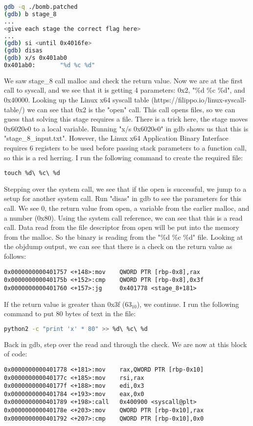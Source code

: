\documentclass{article}
\begin{document}
\begin{lstlisting}[language=Bash]
gdb -q ./bomb.patched
(gdb) b stage_8
...
<give each stage the correct flag here>
...
(gdb) si <until 0x4016fe>
(gdb) disas
(gdb) x/s 0x401ab0
0x401ab0:       "%d %c %d"
\end{lstlisting}
We saw stage\_8 call malloc and check the return value.  Now we are at the 
first call to syscall, and we see that it is getting 4 parameters: 0x2, "\%d
\%c \%d", and 0x40000.  Looking up the Linux x64 syscall table 
(https://filippo.io/linux-syscall-table/) we can see that 0x2 is the "open" 
call.  This call opens files, so we can guess that solving this stage requires
a file.  There is a trick here, the stage moves 0x6020e0 to a local variable.
Running "x/s 0x6020e0" in gdb shows us that this is "stage\_8\_input.txt".  
However, the Linux x64 Application Binary Interface requires 6 registers to be
used before passing stack parameters to a function call, so this is a red 
herring.  I run the following command to create the required file:
\begin{lstlisting}
touch %d\ %c\ %d
\end{lstlisting}
\par
Stepping over the system call, we see that if the open is successful, we jump
to a setup for another system call.  Run "disas" in gdb to see the parameters
for this call.  We see 0, the return value from open, a variable from the 
earlier malloc, and a number (0x80).  Using the system call reference, we can
see that this is a read call.  Data read from the file descriptor from open 
will be put into the memory from the malloc.  So the binary is reading from 
the "\%d \%c \%d" file.  Looking at the objdump output, we can see that there 
is a check on the return value as follows:
\begin{lstlisting}
0x0000000000401757 <+148>:mov    QWORD PTR [rbp-0x8],rax
0x000000000040175b <+152>:cmp    QWORD PTR [rbp-0x8],0x3f
0x0000000000401760 <+157>:jg     0x401778 <stage_8+181>
\end{lstlisting}
\par
If the return value is greater than 0x3f ($63_{10}$), we continue.  I run the
following command to put 80 bytes of text in the file: 
\begin{lstlisting}[language=Bash]
python2 -c "print 'x' * 80" >> %d\ %c\ %d
\end{lstlisting}
Back in gdb, step over the read and through the check.  We are now at this block of code:
\begin{lstlisting}
0x0000000000401778 <+181>:mov    rax,QWORD PTR [rbp-0x10]
0x000000000040177c <+185>:mov    rsi,rax
0x000000000040177f <+188>:mov    edi,0x3
0x0000000000401784 <+193>:mov    eax,0x0
0x0000000000401789 <+198>:call   0x400900 <syscall@plt>
0x000000000040178e <+203>:mov    QWORD PTR [rbp-0x10],rax
0x0000000000401792 <+207>:cmp    QWORD PTR [rbp-0x10],0x0
\end{lstlisting}
\end{document}
